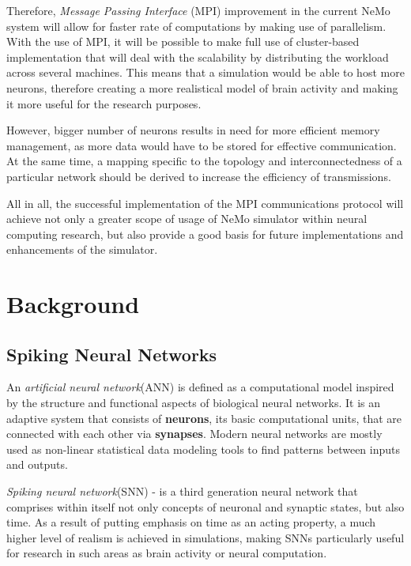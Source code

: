 \documentclass[12pt]{report}
\begin{document}
Therefore, \emph{Message Passing Interface} (MPI) improvement in the current NeMo system will allow for faster rate of computations by making use 
of parallelism. With the use of MPI, it will be possible to make full use of cluster-based implementation that will deal with the scalability by 
distributing the workload across several machines. This means that a simulation would be able to host more neurons, therefore creating a more 
realistical model of brain activity and making it more useful for the research purposes.

However, bigger number of neurons results in need for more efficient memory management, as more data would have to be stored for effective 
communication. At the same time, a mapping specific to the topology and interconnectedness of a particular network should be derived to increase
the efficiency of transmissions.

All in all, the successful implementation of the MPI communications protocol will achieve not only a greater scope of usage of NeMo simulator within
neural computing research, but also provide a good basis for future implementations and enhancements of the simulator.

\chapter{Background}

\section{Spiking Neural Networks}

An \emph{artificial neural network}(ANN) is defined as a computational model inspired by the structure and functional aspects of biological neural networks.\cite{ActFunc}
It is an adaptive system that consists of \textbf{neurons}, its basic computational units, that are connected with each other via \textbf{synapses}.
Modern neural networks are mostly used as non-linear statistical data modeling tools to find patterns between inputs and outputs.\cite{Bar-Yam2003}

\emph{Spiking neural network}(SNN) - is a third generation neural network that comprises within itself not only concepts of neuronal and synaptic states, but 
also time.\cite{Maass1997} As a result of putting emphasis on time as an acting property, a much higher level of realism is achieved in simulations,
making SNNs particularly useful for research in such areas as brain activity or neural computation.
\end{document}
